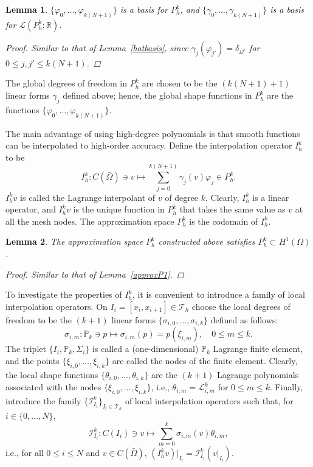 \documentclass{article}
\newtheorem{lemma}{Lemma}
\begin{document}
\begin{lemma}
    $\{\varphi_0, \dots, \varphi_{k(N+1)}\}$ is a basis for $P_h^k$, and $\{\gamma_0, \dots, \gamma_{k(N+1)}\}$ is a basis for $\mathcal{L}(P_h^k; \mathbb{R})$.

\begin{proof}
    Similar to that of Lemma~\ref{hatbasis}, since $\gamma_j(\varphi_{j'}) = \delta_{jj'}$ for $0 \le j,j' \le k(N+1)$.
\end{proof}
\end{lemma}
The global degrees of freedom in $P_h^k$ are chosen to be the $(k(N+1)+1)$ linear forms $\gamma_j$ defined above; hence, the global shape functions in $P_h^k$ are the functions $\{\varphi_0, \dots, \varphi_{k(N+1)}\}$.

The main advantage of using high-degree polynomials is that smooth functions can be interpolated to high-order accuracy. Define the interpolation operator $I_h^k$ to be
$$ I_h^k: C(\bar{\Omega}) \ni v \mapsto \sum_{j=0}^{k(N+1)} \gamma_j(v) \varphi_j \in P_h^k. $$
$I_h^k v$ is called the Lagrange interpolant of $v$ of degree $k$. Clearly, $I_h^k$ is a linear operator, and $I_h^k v$ is the unique function in $P_h^k$ that takes the same value as $v$ at all the mesh nodes. The approximation space $P_h^k$ is the codomain of $I_h^k$. 

\begin{lemma}
    The approximation space $P_h^k$ constructed above satisfies $P_h^k \subset H^1(\Omega)$.
\begin{proof}
    Similar to that of Lemma~\ref{approxP1}.
\end{proof}
\end{lemma}
To investigate the properties of $I_h^k$, it is convenient to introduce a family of local interpolation operators. On $I_i = [x_i, x_{i+1}] \in \mathcal{T}_h$ choose the local degrees of freedom to be the $(k+1)$ linear forms $\{\sigma_{i,0}, \dots, \sigma_{i,k}\}$ defined as follows:
$$ \sigma_{i,m}: \mathbb{P}_k \ni p \mapsto \sigma_{i,m}(p) = p(\xi_{i,m}), \quad 0 \le m \le k. $$
The triplet $\{I_i, \mathbb{P}_k, \Sigma_i\}$ is called a (one-dimensional) $\mathbb{P}_k$ Lagrange finite element, and the points $\{\xi_{i,0}, \dots, \xi_{i,k}\}$ are called the nodes of the finite element. Clearly, the local shape functions $\{\theta_{i,0}, \dots, \theta_{i,k}\}$ are the $(k+1)$ Lagrange polynomials associated with the nodes $\{\xi_{i,0}, \dots, \xi_{i,k}\}$, i.e., $\theta_{i,m} = \mathcal{L}_{i,m}^k$ for $0 \le m \le k$. Finally, introduce the family $\{\mathcal{I}_{I_i}^k\}_{I_i \in \mathcal{T}_h}$ of local interpolation operators such that, for $i \in \{0, \dots, N\}$,
$$ \mathcal{I}_{I_i}^k: C(I_i) \ni v \mapsto \sum_{m=0}^k \sigma_{i,m}(v) \theta_{i,m}, $$
i.e., for all $0 \le i \le N$ and $v \in C(\bar{\Omega})$, $(I_h^k v)|_{I_i} = \mathcal{I}_{I_i}^k(v|_{I_i})$.
\end{document}
